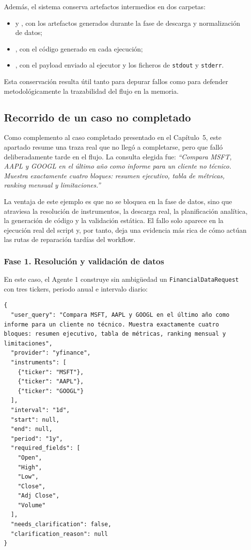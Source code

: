 Adem\'as, el sistema conserva artefactos intermedios en dos carpetas:

\begin{itemize}
    \item {} y , con los artefactos generados durante la fase de descarga y normalizaci\'on de datos;
    \item {}, con el c\'odigo generado en cada ejecuci\'on;
    \item {}, con el payload enviado al ejecutor y los ficheros de \texttt{stdout} y \texttt{stderr}.
\end{itemize}

Esta conservaci\'on resulta \'util tanto para depurar fallos como para defender metodol\'ogicamente la trazabilidad del flujo en la memoria.

\subsection{Recorrido de un caso no completado}
\label{anx:caso_no_completado}

Como complemento al caso completado presentado en el Cap\'itulo~5, este apartado resume una traza real que no lleg\'o a completarse, pero que fall\'o
deliberadamente tarde en el flujo. La consulta elegida fue: \emph{``Compara MSFT, AAPL y GOOGL en el \'ultimo a\~no como informe para un cliente no
t\'ecnico. Muestra exactamente cuatro bloques: resumen ejecutivo, tabla de m\'etricas, ranking mensual y limitaciones.''}

La ventaja de este ejemplo es que no se bloquea en la fase de datos, sino que atraviesa la resoluci\'on de instrumentos, la descarga real, la planificaci\'on
anal\'itica, la generaci\'on de c\'odigo y la validaci\'on est\'atica. El fallo solo aparece en la ejecuci\'on real del script y, por tanto, deja una evidencia
m\'as rica de c\'omo act\'uan las rutas de reparaci\'on tard\'ias del workflow.

\subsubsection{Fase 1. Resoluci\'on y validaci\'on de datos}

En este caso, el Agente 1 construye sin ambig\"uedad un \texttt{FinancialDataRequest} con tres tickers, periodo anual e intervalo diario:

\begin{lstlisting}[style=traceblock]
{
  "user_query": "Compara MSFT, AAPL y GOOGL en el último año como informe para un cliente no técnico. Muestra exactamente cuatro bloques: resumen ejecutivo, tabla de métricas, ranking mensual y limitaciones",
  "provider": "yfinance",
  "instruments": [
    {"ticker": "MSFT"},
    {"ticker": "AAPL"},
    {"ticker": "GOOGL"}
  ],
  "interval": "1d",
  "start": null,
  "end": null,
  "period": "1y",
  "required_fields": [
    "Open",
    "High",
    "Low",
    "Close",
    "Adj Close",
    "Volume"
  ],
  "needs_clarification": false,
  "clarification_reason": null
}
\end{lstlisting}

